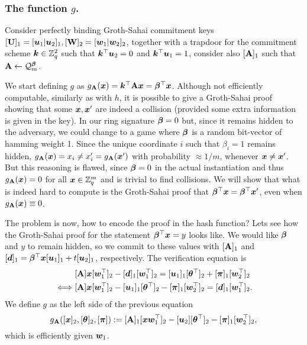 \subsubsection{The function $g$.} Consider perfectly binding Groth-Sahai commitment keys $[\mathbf{{U}}]_1=[{\boldsymbol{u}}_1|{\boldsymbol{u}}_2]_1,[\mathbf{{W}}]_2 = [{\boldsymbol{w}}_1|{\boldsymbol{w}}_2]_2$, together with a trapdoor for the commitment scheme ${\boldsymbol{k}}\in\mathbb{Z}_q^2$ such that ${\boldsymbol{k}}^\top{\boldsymbol{u}}_2=0$ and ${\boldsymbol{k}}^\top{\boldsymbol{u}}_1=1$, consider also $[\mathbf{{A}}]_1$ such that $\mathbf{{A}}\gets\mathcal{Q}_m^{\boldsymbol{\beta}}$.

We start defining $g$ as $g_{\mathbf{{A}}}({\boldsymbol{x}}) = {\boldsymbol{k}}^\top\mathbf{{A}}{\boldsymbol{x}} = {\boldsymbol{\beta}}^\top{\boldsymbol{x}}$. Although not efficiently computable, similarly as with $h$, it is possible to give a Groth-Sahai proof showing that some ${\boldsymbol{x}},{\boldsymbol{x}}'$ are indeed a collision (provided some extra information is given in the key).
In our ring signature ${\boldsymbol{\beta}}=0$ but, since it remains hidden to the adversary, we could change to a game where ${\boldsymbol{\beta}}$ is a random bit-vector of hamming weight 1. Since the unique coordinate $i$ such that $\beta_i=1$ remains hidden, $g_{\mathbf{{A}}}({\boldsymbol{x}}) = x_i \neq x'_i =g_{\mathbf{{A}}}({\boldsymbol{x}}')$ with probability $\approx 1/m$, whenever ${\boldsymbol{x}}\neq{\boldsymbol{x}}'$. But this reasoning is flawed, since ${\boldsymbol{\beta}}=0$ in the actual instantiation and thus $g_{\mathbf{{A}}}({\boldsymbol{x}}) = 0$ for all ${\boldsymbol{x}}\in\mathbb{Z}_q^m$ and is trivial to find collisions.
We will show that what is indeed hard to compute is the Groth-Sahai proof that ${\boldsymbol{\beta}}^\top{\boldsymbol{x}} = {\boldsymbol{\beta}}^\top{\boldsymbol{x}}'$, even when $g_{\mathbf{{A}}}({\boldsymbol{x}})\equiv 0$.

The problem is now, how to encode the proof in the hash function? Lets see how the Groth-Sahai proof for the statement ${\boldsymbol{\beta}}^\top{\boldsymbol{x}} = y$ looks like. We would like ${\boldsymbol{\beta}}$ and $y$ to remain hidden, so we commit to these values with $[\mathbf{{A}}]_1$ and $[{\boldsymbol{d}}]_1 = {\boldsymbol{\beta}}^\top{\boldsymbol{x}}[{\boldsymbol{u}}_1]_1+t[{\boldsymbol{u}}_2]_1$, respectively. The verification equation is
\begin{align*}
&[\mathbf{{A}}]{\boldsymbol{x}}[{\boldsymbol{w}}_1^\top]_2-[{\boldsymbol{d}}]_1[{\boldsymbol{w}}_1^\top]_2 = [{\boldsymbol{u}}_1]_1[{\boldsymbol{\theta}}^\top]_2+[{\boldsymbol{\pi}}]_1[{\boldsymbol{w}}_2^\top]_2\\
\iff & [\mathbf{{A}}]{\boldsymbol{x}}[{\boldsymbol{w}}_1^\top]_2 - [{\boldsymbol{u}}_1]_1[{\boldsymbol{\theta}}^\top]_2 - [{\boldsymbol{\pi}}]_1[{\boldsymbol{w}}_2^\top]_2 = [{\boldsymbol{d}}]_1[{\boldsymbol{w}}_1^\top]_2.
\end{align*}
We define $g$ as the left side of the previous equation
$$
g_{\mathbf{{A}}}([{\boldsymbol{x}}]_2,[{\boldsymbol{\theta}}]_2,[{\boldsymbol{\pi}}]):= [\mathbf{{A}}]_1[{\boldsymbol{x}}{\boldsymbol{w}}_1^\top]_2-[{\boldsymbol{u}}_2][{\boldsymbol{\theta}}^\top]_2-[{\boldsymbol{\pi}}]_1[{\boldsymbol{w}}_2^\top]_2,
$$
which is efficiently given ${\boldsymbol{w}}_1$.

